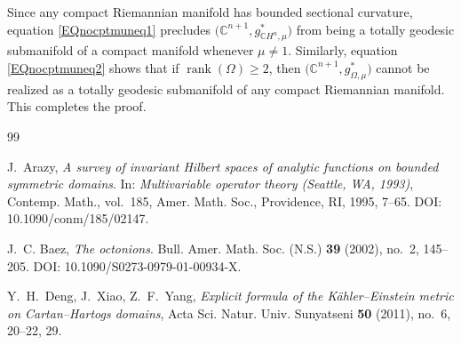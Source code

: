 \documentclass[reqno, 11pt]{amsart}
\newcommand{\C}{\mathbb{C}}
\newcommand{\rank}{\operatorname {rank}}
\newcommand{\W}{\Omega}
\begin{document}
Since any compact Riemannian manifold has bounded sectional curvature, equation \eqref{EQnocptmuneq1} precludes \(\bigl(\C^{n+1},g^*_{\C H^n,\mu}\bigr)\) from being a totally geodesic submanifold of a compact manifold whenever \(\mu\neq1\).  Similarly, equation \eqref{EQnocptmuneq2} shows that if \(\rank(\W)\ge2\), then \(\bigl(\C^{n+1},g^*_{\W,\mu}\bigr)\) cannot be realized as a totally geodesic submanifold of any compact Riemannian manifold.  This completes the proof.





%
%


\begin{thebibliography}{99}





\label{ARAZYbookAsurveyOfInvariant}
J.~Arazy, \textit{A survey of invariant Hilbert spaces of analytic functions on bounded symmetric domains}. In: \textit{Multivariable operator theory (Seattle, WA, 1993)}, Contemp. Math., vol.~185, Amer. Math. Soc., Providence, RI, 1995, 7--65. DOI: 10.1090/conm/185/02147.

\label{BAEZoctonions2002}
J.~C. Baez, \textit{The octonions}. Bull. Amer. Math. Soc. (N.S.) \textbf{39} (2002), no.~2, 145--205. DOI: 10.1090/S0273-0979-01-00934-X.





Y.~H.~Deng, J.~Xiao, Z.~F.~Yang,
\emph{Explicit formula of the K\"ahler--Einstein metric on Cartan--Hartogs domains},
Acta Sci. Natur. Univ. Sunyatseni \textbf{50} (2011), no.~6, 20--22, 29.




\end{thebibliography}
\end{document}
